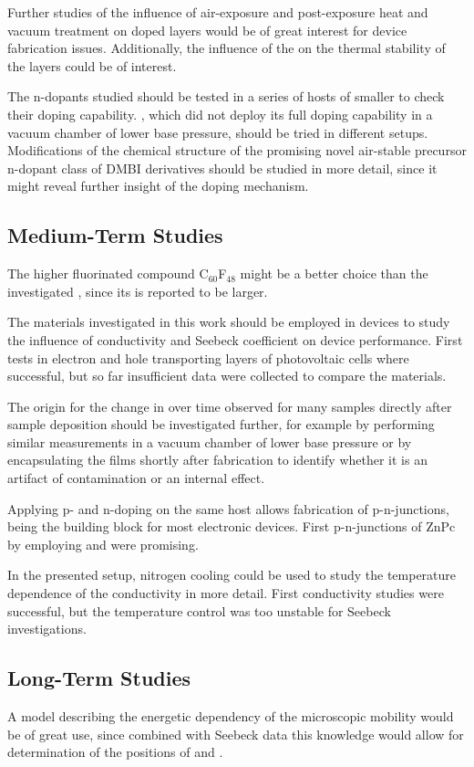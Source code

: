 Further studies of the influence of air-exposure and post-exposure heat and vacuum treatment on doped layers would be of great interest for device fabrication issues. Additionally, the influence of the \CLong on the thermal stability of the layers could be of interest.

The n-dopants studied should be tested in a series of hosts of smaller \EAs to check their doping capability.
\meodmbiI, which did not deploy its full doping capability in a vacuum chamber of lower base pressure, should be tried in different setups.
Modifications of the chemical structure of the promising novel air-stable precursor n-dopant class of DMBI derivatives should be studied in more detail, since it might reveal further insight of the doping mechanism.

\subsection*{Medium-Term Studies}
The higher fluorinated compound C$_{60}$F$_{48}$ might be a better choice than the investigated \CSF, since its \EA is reported to be larger\cite{Liu1997}.

The materials investigated in this work should be employed in devices to study the influence of conductivity and Seebeck coefficient on device performance. First tests in electron and hole transporting layers of photovoltaic cells where successful, but so far insufficient data were collected to compare the materials.

The origin for the change in \cLong over time observed for many samples directly after sample deposition should be investigated further, for example by performing similar measurements in a vacuum chamber of lower base pressure or by encapsulating the films shortly after fabrication to identify whether it is an artifact of contamination or an internal effect.

Applying p- and n-doping on the same host allows fabrication of p-n-junctions, being the building block for most electronic devices. First p-n-junctions of ZnPc by employing \CSF and \WPd were promising\cite{Burtone2013}.

In the presented setup, nitrogen cooling could be used to study the temperature dependence of the conductivity in more detail. First conductivity studies were successful, but the temperature control was too unstable for Seebeck investigations.

\subsection*{Long-Term Studies}
A model describing the energetic dependency of the microscopic mobility would be of great use, since combined with Seebeck data this knowledge would allow for determination of the positions of \EtLong and \EfLong.

